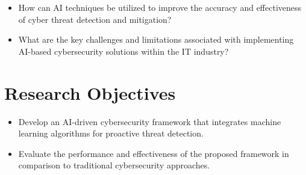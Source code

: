 \documentclass[a4paper,man,12pt]{article}
\begin{document}
  
  \begin{itemize}
    \item How can AI techniques be utilized to improve the accuracy and effectiveness of cyber threat detection and mitigation?
    \item What are the key challenges and limitations associated with implementing AI-based cybersecurity solutions within the IT industry?
  \end{itemize}


\section{Research Objectives}

  
  \lipsum[2] %

  
  \begin{itemize}
    \item Develop an AI-driven cybersecurity framework that integrates machine learning algorithms for proactive threat detection.

    \item Evaluate the performance and effectiveness of the proposed framework in comparison to traditional cybersecurity approaches.
  \end{itemize}
\end{document}
